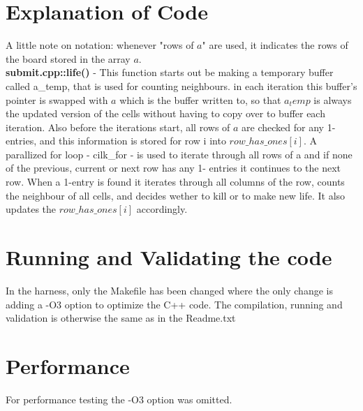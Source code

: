 \newcommand{\figurepath}{./figures/}
\newcommand{\figurescale}{0.6}
\newcommand{\codepath}{../matlab/}

\section*{Explanation of Code}
A little note on notation: whenever "rows of $a$" are used, it indicates the rows of the board stored in the array $a$. \\
\textbf{submit.cpp::life()} - This function starts out be making a temporary buffer called a_temp, that is used for counting neighbours. in each iteration this buffer's pointer is swapped with $a$ which is the buffer written to, so that $a_temp$ is always the updated version of the cells without having to copy over to buffer each iteration.
Also before the iterations start, all rows of $a$ are checked for any 1-entries, and this information is stored for row i into $row\_has\_ones[i]$.
A parallized for loop - cilk_for - is used to iterate through all rows of a and if none of the previous, current or next row has any 1- entries it continues to the next row. When a 1-entry is found it iterates through all columns of the row, counts the neighbour of all cells, and decides wether to kill or to make new life. It also updates the $row\_has\_ones[i]$ accordingly.

\section*{Running and Validating the code}
In the harness, only the Makefile has been changed where the only change is adding a -O3 option to optimize the C++ code. 
The compilation, running and validation is otherwise the same as in the Readme.txt

\section*{Performance}
For performance testing the -O3 option was omitted. 

